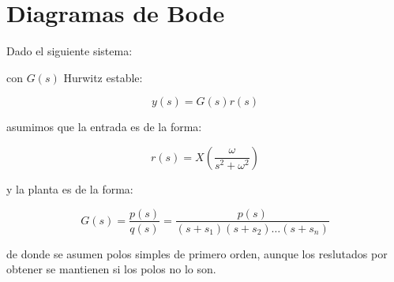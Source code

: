 
\chapter{Diagramas de Bode}

    Dado el siguiente sistema:

    \begin{figure}
        \centering
    \end{figure}

    con $G(s)$ Hurwitz estable:

    \begin{equation*}
        y(s) = G(s) r(s)
    \end{equation*}

    asumimos que la entrada es de la forma:

    \begin{equation*}
        r(s) = X \left( \frac{\omega}{s^2 + \omega^2} \right)
    \end{equation*}

    y la planta es de la forma:

    \begin{equation*}
        G(s) = \frac{p(s)}{q(s)} = \frac{p(s)}{(s + s_1) (s + s_2) \dots (s + s_n)}
    \end{equation*}

    de donde se asumen polos simples de primero orden, aunque los reslutados por obtener se mantienen si los polos no lo son.

